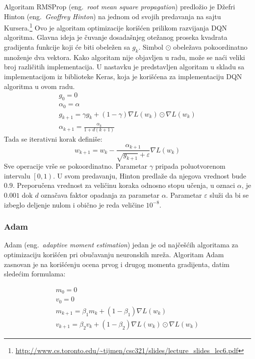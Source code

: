 Algoritam RMSProp (eng.~{\em root mean square propagation}) predložio je Džefri Hinton (eng.~{\em Geoffrey Hinton}) na jednom od svojih predavanja na sajtu Kursera.\footnote{\url{http://www.cs.toronto.edu/~tijmen/csc321/slides/lecture_slides_lec6.pdf}} Ovo je algoritam optimizacije korišćen prilikom razvijanja DQN algoritma. Glavna ideja je čuvanje dosadašnjeg otežanog proseka kvadrata gradijenta funkcije koji će biti obeležen sa $g_k$. Simbol $\odot$ obeležava pokoordinatno množenje dva vektora. Kako algoritam nije objavljen u radu, može se naći veliki broj različitih implementacija. U nastavku je predstavljen algoritam u skladu sa implementacijom iz biblioteke Keras, koja je korišćena za implementaciju DQN algoritma u ovom radu.
\begin{equation}
	\begin{gathered}
		g_0 = 0 \\
		\alpha_0 = \alpha \\
		g_{k+1} = \gamma g_k + (1 - \gamma)\nabla L(w_k) \odot \nabla L(w_k) \\
		\alpha_{k+1} = \frac{\alpha_k}{1+d(k+1)}	
	\end{gathered}
\end{equation}
Tada se iterativni korak definiše: 
\begin{equation}
	w_{k+1} = w_k - \frac{\alpha_{k+1}}{\sqrt{g_{k+1}} + \varepsilon} \nabla L(w_k)
\end{equation}
Sve operacije vrše se pokoordinatno. Parametar $\gamma$ pripada poluotvorenom intervalu $\left[0, 1\right) $. U svom predavanju, Hinton predlaže da njegova vrednost bude $0.9$. Preporučena vrednost za veličinu koraka odnosno stopu učenja, u oznaci $\alpha$, je $0.001$ dok $d$ označava faktor opadanja za parametar $\alpha$. Parametar $\varepsilon$ služi da bi se izbeglo deljenje nulom i obično je reda veličine $10^{-8}$.

\subsubsection{Adam}

Adam (eng.~{\em adaptive moment estimation}) jedan je od najčešćih algoritama za optimizaciju korišćen pri obučavanju neuronskih mreža. Algoritam Adam zasnovan je na korišćenju ocena prvog i drugog momenta gradijenta, datim sledećim formulama:

\begin{equation}
	\begin{gathered}
			m_0 = 0 \\
			v_0 = 0 \\ 
			m_{k+1} = \beta_1 m_k + (1-\beta_1) \nabla L(w_k) \\
			v_{k+1} = \beta_2 v_k + (1-\beta_2) \nabla L(w_k) \odot \nabla L(w_k) 
	\end{gathered}
\end{equation}

